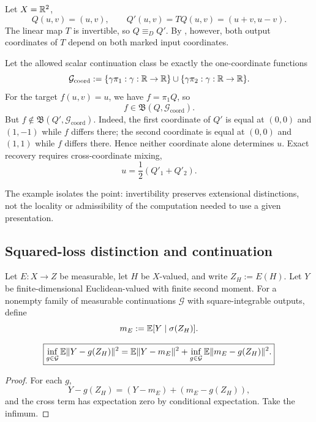 \begin{example}\label{ex:affine-presentation-v13}
Let $X=\mathbb{R}^2$,
\[
Q(u,v)=(u,v),
\qquad
Q'(u,v)=TQ(u,v)=(u+v,u-v).
\]
The linear map $T$ is invertible, so $Q\equiv_DQ'$. By , however, both output coordinates of $T$ depend on both marked input coordinates.

Let the allowed scalar continuation class be exactly the one-coordinate functions
\[
\mathcal G_{\mathrm{coord}}
:=
\{\gamma\pi_1:\gamma:\mathbb{R}\to\mathbb{R}\}
\cup
\{\gamma\pi_2:\gamma:\mathbb{R}\to\mathbb{R}\}.
\]
For the target $f(u,v)=u$, we have $f=\pi_1Q$, so
\[
f\in\mathfrak B(Q,\mathcal G_{\mathrm{coord}}).
\]
But $f\notin\mathfrak B(Q',\mathcal G_{\mathrm{coord}})$. Indeed, the first coordinate of $Q'$ is equal at $(0,0)$ and $(1,-1)$ while $f$ differs there; the second coordinate is equal at $(0,0)$ and $(1,1)$ while $f$ differs there. Hence neither coordinate alone determines $u$. Exact recovery requires cross-coordinate mixing,
\[
\boxed{
u=\frac12(Q'_1+Q'_2).}
\]
\end{example}

The example isolates the point: invertibility preserves extensional distinctions, not the locality or admissibility of the computation needed to use a given presentation.

\subsection{Squared-loss distinction and continuation}

Let $E:X\to Z$ be measurable, let $H$ be $X$-valued, and write $Z_H:=E(H)$. Let $Y$ be finite-dimensional Euclidean-valued with finite second moment. For a nonempty family of measurable continuations $\mathcal G$ with square-integrable outputs, define
\[
m_E:=\mathbb{E}[Y\mid\sigma(Z_H)].
\]

\begin{theorem}\label{thm:squared-decomposition-v13}
\[
\boxed{
\inf_{g\in\mathcal G}\mathbb{E}\|Y-g(Z_H)\|^2
=
\mathbb{E}\|Y-m_E\|^2
+
\inf_{g\in\mathcal G}\mathbb{E}\|m_E-g(Z_H)\|^2.
}
\]
\end{theorem}

\begin{proof}
For each $g$,
\[
Y-g(Z_H)=(Y-m_E)+(m_E-g(Z_H)),
\]
and the cross term has expectation zero by conditional expectation. Take the infimum.
\end{proof}

